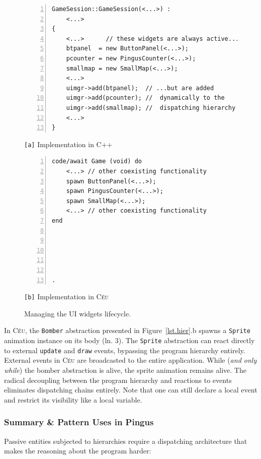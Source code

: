 \documentclass{vgtc}                          %
\newcommand{\CEU}{\textsc{C\'{e}u}\xspace}
\newcommand{\code}[1] {{\small{\texttt{#1}}}}
\newcommand{\ax}{\code{[a]}\xspace}
\newcommand{\bx}{\code{[b]}\xspace}
\begin{document}
\begin{figure}[t]
\begin{minipage}[t]{0.54\linewidth}
\begin{lstlisting}[numbers=left,xleftmargin=3em]
GameSession::GameSession(<...>) :
    <...>
{
    <...>      // these widgets are always active...
    btpanel  = new ButtonPanel(<...>);
    pcounter = new PingusCounter(<...>);
    smallmap = new SmallMap(<...>);
    <...>
    uimgr->add(btpanel);  // ...but are added
    uimgr->add(pcounter); //  dynamically to the
    uimgr->add(smallmap); //  dispatching hierarchy
    <...>
}
\end{lstlisting}
\centering\small{\ax Implementation in C++}
\end{minipage}
%
\begin{minipage}[t]{0.46\linewidth}
\begin{lstlisting}[numbers=left,xleftmargin=3em]
code/await Game (void) do
    <...> // other coexisting functionality
    spawn ButtonPanel(<...>);
    spawn PingusCounter(<...>);
    spawn SmallMap(<...>);
    <...> // other coexisting functionality
end





.
\end{lstlisting}
\centering\small{\bx Implementation in \CEU}
\end{minipage}
\caption{ Managing the UI widgets lifecycle.
\label{lst.ui}
}
\end{figure}

In \CEU, the \code{Bomber} abstraction presented in Figure~\ref{lst.hier}.b
spawns a \code{Sprite} animation instance on its body (ln. 3).
%
The \code{Sprite} abstraction can react directly to external \code{update}
and \code{draw} events, bypassing the program hierarchy entirely.
External events in \CEU are broadcasted to the entire application.
While (\emph{and only while}) the bomber abstraction is alive, the sprite
animation remains alive.
The radical decoupling between the program hierarchy and reactions to events
eliminates dispatching chains entirely.
Note that one can still declare a local event and restrict its visibility like
a local variable.

\subsubsection{Summary \& Pattern Uses in Pingus}

Passive entities subjected to hierarchies require a dispatching architecture
that makes the reasoning about the program harder:
\end{document}
